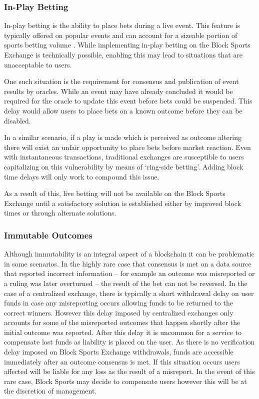 \documentclass{article}
\begin{document}
		\subsubsection{In-Play Betting} \label{in-play-betting}
In-play betting is the ability to place bets during a live event. This feature is typically offered on popular events and can account for a sizeable portion of sports betting volume \cite{in-play}. While implementing in-play betting on the Block Sports Exchange is technically possible, enabling this may lead to situations that are unacceptable to users.

One such situation is the requirement for consensus and publication of event results by oracles. While an event may have already concluded it would be required for the oracle to update this event before bets could be suspended. This delay would allow users to place bets on a known outcome before they can be disabled.

In a similar scenario, if a play is made which is perceived as outcome altering there will exist an unfair opportunity to place bets before market reaction. Even with instantaneous transactions, traditional exchanges are susceptible to users capitalizing on this vulnerability by means of ‘ring-side betting’.  Adding block time delays will only work to compound this issue.

As a result of this, live betting will not be available on the Block Sports Exchange until a satisfactory solution is established either by improved block times or through alternate solutions.

		\subsubsection{Immutable Outcomes} \label{immutable-outcomes}
Although immutability is an integral aspect of a blockchain it can be problematic in some scenarios. In the highly rare case that consensus is met on a data source that reported incorrect information -- for example an outcome was misreported or a ruling was later overturned -- the result of the bet can not be reversed. In the case of a centralized exchange, there is typically a short withdrawal delay on user funds in case any misreporting occurs allowing funds to be returned to the correct winners. However this delay imposed by centralized exchanges only accounts for some of the misreported outcomes that happen shortly after the initial outcome was reported. After this delay it is uncommon for a service to compensate lost funds as liability is placed on the user. As there is no verification delay imposed on Block Sports Exchange withdrawals, funds are accessible immediately after an outcome consensus is met. If this situation occurs users affected will be liable for any loss as the result of a misreport. In the event of this rare case, Block Sports may decide to compensate users however this will be at the discretion of management.
\end{document}
